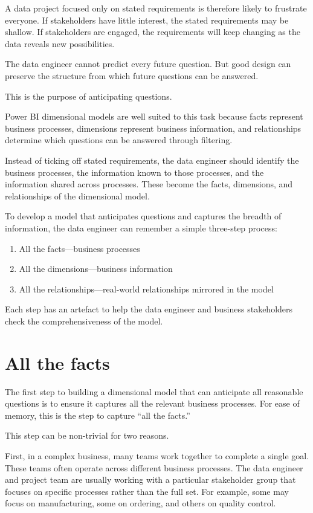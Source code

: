 \documentclass[10pt,openany,10pt]{book}
\providecommand{\tightlist}{%
  \setlength{\itemsep}{0pt}\setlength{\parskip}{0pt}}
\begin{document}
A data project focused only on stated requirements is therefore likely
to frustrate everyone. If stakeholders have little interest, the stated
requirements may be shallow. If stakeholders are engaged, the
requirements will keep changing as the data reveals new possibilities.

The data engineer cannot predict every future question. But good design
can preserve the structure from which future questions can be answered.

This is the purpose of anticipating questions.

Power BI dimensional models are well suited to this task because facts
represent business processes, dimensions represent business information,
and relationships determine which questions can be answered through
filtering.

Instead of ticking off stated requirements, the data engineer should
identify the business processes, the information known to those
processes, and the information shared across processes. These become the
facts, dimensions, and relationships of the dimensional model.

To develop a model that anticipates questions and captures the breadth
of information, the data engineer can remember a simple three-step
process:

\begin{enumerate}
\def\labelenumi{\arabic{enumi}.}
\tightlist
\item
  All the facts---business processes
\item
  All the dimensions---business information
\item
  All the relationships---real-world relationships mirrored in the model
\end{enumerate}

Each step has an artefact to help the data engineer and business
stakeholders check the comprehensiveness of the model.

\section{All the facts}\label{all-the-facts}

The first step to building a dimensional model that can anticipate all
reasonable questions is to ensure it captures all the relevant business
processes. For ease of memory, this is the step to capture ``all the
facts.''

This step can be non-trivial for two reasons.

First, in a complex business, many teams work together to complete a
single goal. These teams often operate across different business
processes. The data engineer and project team are usually working with a
particular stakeholder group that focuses on specific processes rather
than the full set. For example, some may focus on manufacturing, some on
ordering, and others on quality control.
\end{document}
